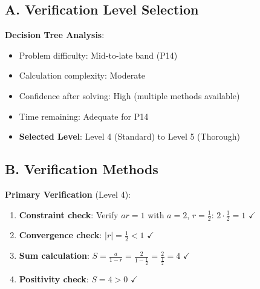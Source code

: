 \documentclass[12pt]{article}
\begin{document}
\begin{verificationbox}
\subsection*{A. Verification Level Selection}

\textbf{Decision Tree Analysis}:
\begin{itemize}[leftmargin=*]
    \item Problem difficulty: Mid-to-late band (P14)
    \item Calculation complexity: Moderate
    \item Confidence after solving: High (multiple methods available)
    \item Time remaining: Adequate for P14
    \item \textbf{Selected Level}: Level 4 (Standard) to Level 5 (Thorough)
\end{itemize}

\subsection*{B. Verification Methods}

\textbf{Primary Verification} (Level 4):
\begin{enumerate}[leftmargin=*]
    \item \textbf{Constraint check}: Verify $ar = 1$ with $a=2$, $r=\frac{1}{2}$: $2 \cdot \frac{1}{2} = 1$ $\checkmark$
    \item \textbf{Convergence check}: $|r| = \frac{1}{2} < 1$ $\checkmark$
    \item \textbf{Sum calculation}: $S = \frac{a}{1-r} = \frac{2}{1-\frac{1}{2}} = \frac{2}{\frac{1}{2}} = 4$ $\checkmark$
    \item \textbf{Positivity check}: $S = 4 > 0$ $\checkmark$
\end{enumerate}


\end{verificationbox}
\end{document}
